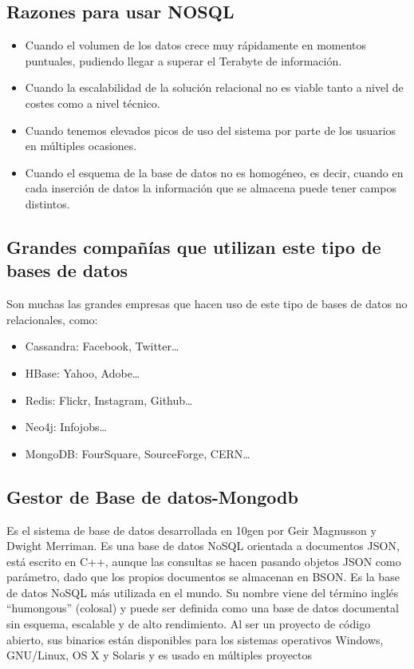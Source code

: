 \documentclass[twoside,twocolumn]{article}
\begin{document}
\subsection{Razones para usar NOSQL}
\begin{itemize}
    \item   Cuando el volumen de los datos crece muy rápidamente en momentos puntuales, pudiendo llegar a superar el Terabyte de información. 
    \item	Cuando la escalabilidad de la solución relacional no es viable tanto a nivel de costes como a nivel técnico. 
    \item	Cuando tenemos elevados picos de uso del sistema por parte de los usuarios en múltiples ocasiones. 
    \item	Cuando el esquema de la base de datos no es homogéneo, es decir, cuando en cada inserción de datos la información que se almacena puede tener campos distintos.
    
\end{itemize}
\subsection{Grandes compañías que utilizan este tipo de bases de datos}
Son muchas las grandes empresas que hacen uso de este tipo de bases de datos no relacionales, como: 
\begin{itemize}
    \item   Cassandra: Facebook, Twitter… 
    \item	HBase: Yahoo, Adobe… 
    \item	Redis: Flickr, Instagram, Github… 
    \item	Neo4j: Infojobs… 
    \item	MongoDB: FourSquare, SourceForge, CERN…
    
\end{itemize}

\subsection{Gestor de Base de datos-Mongodb}
Es el sistema de base de datos desarrollada en 10gen por Geir Magnusson 
y Dwight Merriman. Es una base de datos NoSQL orientada a documentos JSON,
está escrito en C++, 
aunque las consultas se hacen pasando objetos JSON como parámetro,
dado que los propios documentos se almacenan en BSON. Es la base de datos
NoSQL más utilizada en el mundo. Su nombre viene del término inglés “humongous” 
(colosal) y puede ser definida como una base de datos documental sin esquema, 
escalable y de alto rendimiento. Al ser un proyecto de código abierto, sus binarios
están disponibles para los sistemas operativos Windows, GNU/Linux, OS X y Solaris
y es usado en múltiples proyectos
\end{document}
